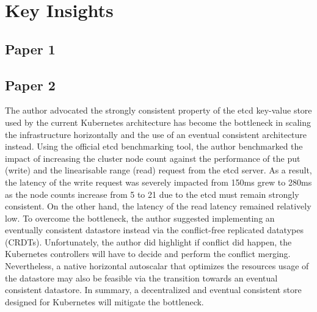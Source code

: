 \section{Key Insights}%
\label{sec:Key Insights}
\subsection{Paper 1}%
\label{sub:Paper 1}






\subsection{Paper 2}%
\label{sub:Paper 2}
The author advocated the strongly consistent property of the etcd key-value store used by the current Kubernetes architecture has become the bottleneck in scaling the infrastructure horizontally and the use of an eventual consistent architecture instead.
Using the official etcd benchmarking tool, the author benchmarked the impact of increasing the cluster node count against the performance of the put (write) and the linearisable range (read) request from the etcd server.
As a result, the latency of the write request was severely impacted from 150ms grew to 280ms as the node counts increase from 5 to 21 due to the etcd must remain strongly consistent.
On the other hand, the latency of the read latency remained relatively low.
To overcome the bottleneck, the author suggested implementing an eventually consistent datastore instead via the conflict-free replicated datatypes (CRDTs).
Unfortunately, the author did highlight if conflict did happen, the Kubernetes controllers will have to decide and perform the conflict merging.
Nevertheless, a native horizontal autoscalar that optimizes the resources usage of the datastore may also be feasible via the transition towards an eventual consistent datastore.
In summary, a decentralized and eventual consistent store designed for Kubernetes will mitigate the bottleneck.












